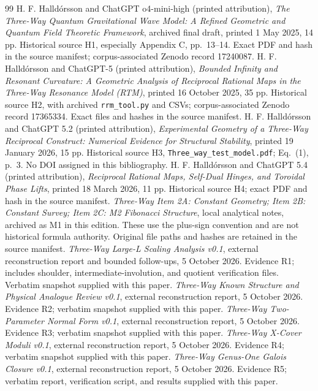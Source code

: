 \begin{thebibliography}{99}
 H. F. Halldórsson and ChatGPT o4-mini-high (printed attribution), \emph{The Three-Way Quantum Gravitational Wave Model: A Refined Geometric and Quantum Field Theoretic Framework}, archived final draft, printed 1 May 2025, 14 pp. Historical source H1, especially Appendix C, pp.~13--14. Exact PDF and hash in the source manifest; corpus-associated Zenodo record 17240087.
 H. F. Halldórsson and ChatGPT-5 (printed attribution), \emph{Bounded Infinity and Resonant Curvature: A Geometric Analysis of Reciprocal Rational Maps in the Three-Way Resonance Model (RTM)}, printed 16 October 2025, 35 pp. Historical source H2, with archived \texttt{rrm\_tool.py} and CSVs; corpus-associated Zenodo record 17365334. Exact files and hashes in the source manifest.
 H. F. Halldórsson and ChatGPT 5.2 (printed attribution), \emph{Experimental Geometry of a Three-Way Reciprocal Construct: Numerical Evidence for Structural Stability}, printed 19 January 2026, 15 pp. Historical source H3, \texttt{Three\_way\_test\_model.pdf}; Eq.~(1), p.~3. No DOI assigned in this bibliography.
 H. F. Halldórsson and ChatGPT 5.4 (printed attribution), \emph{Reciprocal Rational Maps, Self-Dual Hinges, and Toroidal Phase Lifts}, printed 18 March 2026, 11 pp. Historical source H4; exact PDF and hash in the source manifest.
 \emph{Three-Way Item 2A: Constant Geometry; Item 2B: Constant Survey; Item 2C: M2 Fibonacci Structure}, local analytical notes, archived as M1 in this edition. These use the plus-sign convention and are not historical formula authority. Original file paths and hashes are retained in the source manifest.
 \emph{Three-Way Large-L Scaling Analysis v0.1}, external reconstruction report and bounded follow-ups, 5 October 2026. Evidence R1; includes shoulder, intermediate-involution, and quotient verification files. Verbatim snapshot supplied with this paper.
 \emph{Three-Way Known Structure and Physical Analogue Review v0.1}, external reconstruction report, 5 October 2026. Evidence R2; verbatim snapshot supplied with this paper.
 \emph{Three-Way Two-Parameter Normal Form v0.1}, external reconstruction report, 5 October 2026. Evidence R3; verbatim snapshot supplied with this paper.
 \emph{Three-Way X-Cover Moduli v0.1}, external reconstruction report, 5 October 2026. Evidence R4; verbatim snapshot supplied with this paper.
 \emph{Three-Way Genus-One Galois Closure v0.1}, external reconstruction report, 5 October 2026. Evidence R5; verbatim report, verification script, and results supplied with this paper.

\end{thebibliography}
